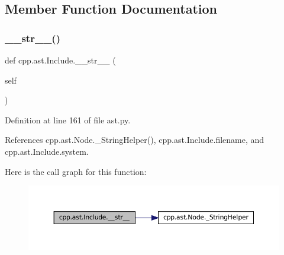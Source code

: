 \subsection{Member Function Documentation}
\mbox{\label{classcpp_1_1ast_1_1Include_ad7d9e5e8f46dcb1a91a282e609412a3e}} 
\subsubsection{\texorpdfstring{\+\_\+\+\_\+str\+\_\+\+\_\+()}{\_\_str\_\_()}}
{\footnotesize\ttfamily def cpp.\+ast.\+Include.\+\_\+\+\_\+str\+\_\+\+\_\+ (\begin{DoxyParamCaption}\item[{}]{self }\end{DoxyParamCaption})}



Definition at line 161 of file ast.\+py.



References cpp.\+ast.\+Node.\+\_\+\+String\+Helper(), cpp.\+ast.\+Include.\+filename, and cpp.\+ast.\+Include.\+system.


Here is the call graph for this function\+:
\nopagebreak
\begin{figure}[H]
\begin{center}
\leavevmode
\includegraphics[width=350pt]{classcpp_1_1ast_1_1Include_ad7d9e5e8f46dcb1a91a282e609412a3e_cgraph}
\end{center}
\end{figure}


